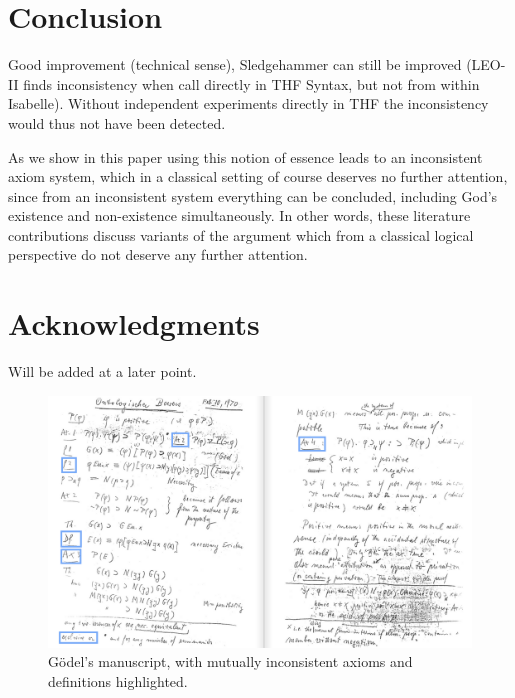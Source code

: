 \documentclass{article}
\begin{document}
\section{Conclusion}


Good improvement (technical sense), Sledgehammer can still be improved
(LEO-II finds inconsistency when call directly in THF Syntax, but not
from within Isabelle). Without independent experiments directly in THF 
the inconsistency would thus not have been detected.


As we show in this paper using this notion of essence
leads to an inconsistent axiom system, which in a classical setting of
course deserves no further attention, since from an inconsistent
system everything can be concluded, including God's existence and
non-existence simultaneously. In other words, these literature
contributions discuss variants of the argument which from a classical
logical perspective do not deserve any further attention.


\section*{Acknowledgments}

Will be added at a later point.



\begin{figure}
\centerline{\includegraphics[width=\textwidth]{./Images/Manuscript2.png}}
\caption{G\"{o}del's manuscript, with mutually inconsistent axioms and definitions highlighted.} \label{GoedelScript}
\end{figure}


\appendix




\end{document}
